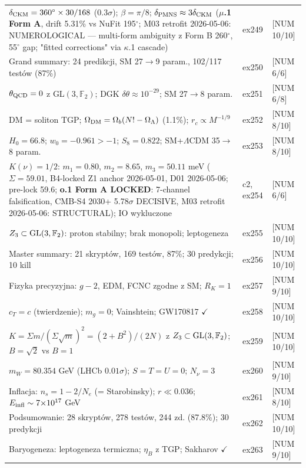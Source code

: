 \begin{center}
\begin{tabular}{@{}lll@{}}
$\delta_{\rm CKM}=360^\circ\times30/168$ (0.3$\sigma$); $\beta=\pi/8$; $\delta_{\rm PMNS}\approx3\delta_{\rm CKM}$ (\textbf{$\mu$.1 Form A}, drift 5.31\% vs NuFit 195$^\circ$; M03 retrofit 2026-05-06: NUMEROLOGICAL --- multi-form ambiguity z Form B 260$^\circ$, 55$^\circ$ gap; "fitted corrections" via $\kappa$.1 cascade) & ex249 & [NUM 10/10] \\
Grand summary: 24 predikcji, SM 27$\to$9 param., 102/117 test\'ow (87\%) & ex250 & [NUM 6/6] \\
$\theta_{\rm QCD}=0$ z GL$(3,\mathbb{F}_2)$; DGK $\delta\theta\approx 10^{-29}$; SM 27$\to$8 param. & ex251 & [NUM 6/8] \\
DM = soliton TGP; $\Omega_{\rm DM}=\Omega_b(N!-\Omega_\Lambda)$ (1.1\%); $r_c\propto M^{-1/9}$ & ex252 & [NUM 8/10] \\
$H_0=66.8$; $w_0=-0.961>-1$; $S_8=0.822$; SM+$\Lambda$CDM 35$\to$8 param. & ex253 & [NUM 8/10] \\
$K(\nu)=1/2$: $m_1{=}0.80$, $m_2{=}8.65$, $m_3{=}50.11$ meV ($\Sigma=59.01$, B4-locked Z1 anchor 2026-05-01, D01 2026-05-06; pre-lock 59.6; \textbf{o.1 Form A LOCKED}: 7-channel falsification, CMB-S4 2030+ 5.78$\sigma$ DECISIVE, M03 retrofit 2026-05-06: STRUCTURAL); IO wykluczone & c2, ex254 & [NUM 6/6] \\
$Z_3 \subset {\rm GL}(3,\mathbb{F}_2)$: proton stabilny; brak monopoli; leptogeneza & ex255 & [NUM 10/10] \\
Master summary: 21 skrypt\'ow, 169 test\'ow, 87\%; 30 predykcji; 10 kill & ex256 & [NUM 10/10] \\
Fizyka precyzyjna: $g{-}2$, EDM, FCNC zgodne z SM; $R_K=1$ & ex257 & [NUM 9/10] \\
$c_T=c$ (twierdzenie); $m_g=0$; Vainshtein; GW170817 $\checkmark$ & ex258 & [NUM 10/10] \\
$K=\Sigma m/(\Sigma\sqrt{m})^2=(2{+}B^2)/(2N)$ z $Z_3\subset{\rm GL}(3,\mathbb{F}_2)$; $B{=}\sqrt{2}$ vs $B{=}1$ & ex259 & [NUM 10/10] \\
$m_W=80.354$ GeV (LHCb $0.01\sigma$); $S{=}T{=}U{=}0$; $N_\nu{=}3$ & ex260 & [NUM 9/10] \\
Inflacja: $n_s=1{-}2/N_e$ (= Starobinsky); $r\ll 0.036$; $E_{\rm infl}\sim 7{\times}10^{17}$ GeV & ex261 & [NUM 8/10] \\
Podsumowanie: 28 skrypt\'ow, 278 test\'ow, 244 zd. (87.8\%); 30 predykcji & ex262 & [NUM 10/10] \\
Baryogeneza: leptogeneza termiczna; $\eta_B$ z TGP; Sakharov $\checkmark$ & ex263 & [NUM 9/10] \\

\end{tabular}
\end{center}
